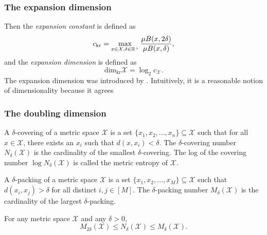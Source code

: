 \documentclass[../main.tex]{subfiles}
\newcommand{\set}[1]{\mathcal {#1}}
\newcommand{\dist}[2]{\distf({#1},{#2})}
\newcommand{\distf}{d}
\newcommand{\krdim}{\text{dim}_\text{kr}}
\newcommand{\krnum}{c_\text{kr}}
\begin{document}

\subsubsection{The expansion dimension}

Then the \emph{expansion constant} is defined as
\begin{equation}
    \krnum = \max_{x\in\set X, \delta\in\R^+} \frac{\mu B(x,2\delta)}{\mu B(x,\delta)}
    ,
\end{equation}
and the \emph{expansion dimension} is defined as
\begin{equation}
    \krdim\set X = \log_2 c_\set X
    .
\end{equation}
The expansion dimension was introduced by \citet{karger2002finding}.
Intuitively, it is a reasonable notion of dimensionality because it agrees


\subsubsection{The doubling dimension}

\begin{definition}
    A $\delta$-covering of a metric space $\set X$ is a set $\{x_1,x_2,...,x_n\} \subseteq \set X$ such that for all $x\in\set X$, there exists an $x_i$ such that $\dist{x}{x_i} < \delta$.
    The $\delta$-covering number $N_\delta(\set X)$ is the cardinality of the smallest $\delta$-covering.
    The log of the covering number $\log N_\delta(\set X)$ is called the metric entropy of $\set X$.
\end{definition}

\begin{definition}
A $\delta$-packing of a metric space $\set X$ is a set $\{x_1,x_2,...,x_M\} \subseteq \set X$ such that $\dist{x_i}{x_j} > \delta$ for all distinct $i,j\in[M]$.
The $\delta$-packing number $M_\delta (\set X)$ is the cardinality of the largest $\delta$-packing.
\end{definition}

\begin{lemma}
    \label{lemma:coverpacking}
    For any metric space $\set X$ and any $\delta>0$,
    \begin{equation}
        M_{2\delta}(\set X) \le N_\delta(\set X) \le M_{\delta}(\set X)
        .
    \end{equation}
\end{lemma}
\end{document}
